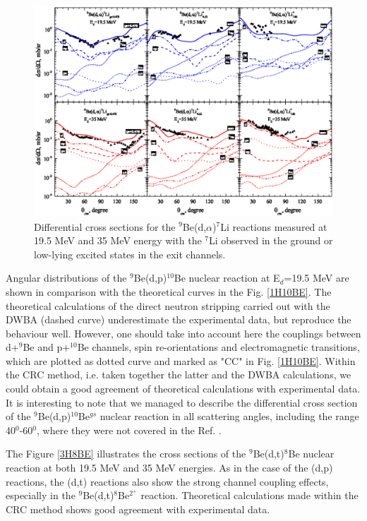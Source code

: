 \documentclass[10pt]{iopart}
\begin{document}
\begin{figure}[bp]
\centering
\includegraphics[scale=0.9]{4HE7LI.eps}
\caption{\label{label} Differential cross sections for the ${}^9$Be(d,$\alpha$)${}^7$Li reactions measured at 19.5 MeV and 35 MeV energy with the $^{7}$Li observed in the ground or low-lying excited states in the exit channels.}
\label{4HE7LI}
\end{figure}	

Angular distributions of the ${}^9$Be(d,p)${}^{10}$Be nuclear reaction at E$_d$=19.5 MeV are shown in comparison with the theoretical curves in the Fig. \ref{1H10BE}.
The theoretical calculations of the direct neutron stripping carried out with the DWBA (dashed curve) underestimate the experimental data, but reproduce the behaviour well.
However, one should take into account here the couplings between d+$^9$Be and p+$^{10}$Be channels, spin re-orientations and electromagnetic transitions, which are plotted as dotted curve and marked as "CC" in Fig. \ref{1H10BE}.
Within the CRC method, i.e. taken together the latter and the DWBA calculations, we could obtain a good agreement of theoretical calculations with experimental data. It is interesting to note that we managed to describe the differential cross section of the ${}^9$Be(d,p)${}^{10}$Be$^{gs}$ nuclear reaction in all scattering angles, including the range 40$^0$-60$^0$, where they were not covered in the Ref. \cite{galanina2012, bodek1989}.

The Figure \ref{3H8BE} illustrates the cross sections of the ${}^9$Be(d,t)${}^{8}$Be nuclear reaction at both 19.5 MeV and 35 MeV energies. As in the case of the (d,p) reactions, the (d,t) reactions also show the strong channel coupling effects, especially in the ${}^9$Be(d,t)${}^{8}$Be$^{2^+}$ reaction. Theoretical calculations made within the CRC method shows good agreement with experimental data.
\end{document}
